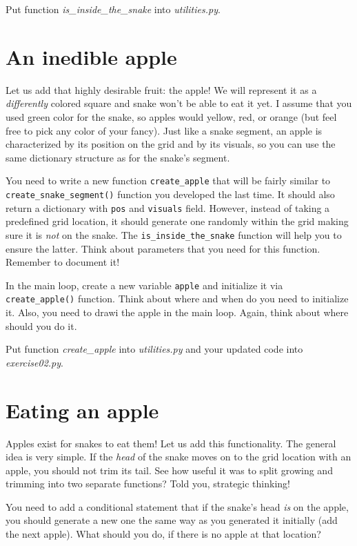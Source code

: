 \documentclass[
]{book}
\begin{document}
Put function \emph{is\_inside\_the\_snake} into \emph{utilities.py}.

\hypertarget{an-inedible-apple}{%
\section{An inedible apple}\label{an-inedible-apple}}

Let us add that highly desirable fruit: the apple! We will represent it as a \emph{differently} colored square and snake won't be able to eat it yet. I assume that you used green color for the snake, so apples would yellow, red, or orange (but feel free to pick any color of your fancy). Just like a snake segment, an apple is characterized by its position on the grid and by its visuals, so you can use the same dictionary structure as for the snake's segment.

You need to write a new function \texttt{create\_apple} that will be fairly similar to \texttt{create\_snake\_segment()} function you developed the last time. It should also return a dictionary with \texttt{pos} and \texttt{visuals} field. However, instead of taking a predefined grid location, it should generate one randomly within the grid making sure it is \emph{not} on the snake. The \texttt{is\_inside\_the\_snake} function will help you to ensure the latter. Think about parameters that you need for this function. Remember to document it!

In the main loop, create a new variable \texttt{apple} and initialize it via \texttt{create\_apple()} function. Think about where and when do you need to initialize it. Also, you need to drawi the apple in the main loop. Again, think about where should you do it.

Put function \emph{create\_apple} into \emph{utilities.py} and your updated code into \emph{exercise02.py}.

\hypertarget{eating-an-apple}{%
\section{Eating an apple}\label{eating-an-apple}}

Apples exist for snakes to eat them! Let us add this functionality. The general idea is very simple. If the \emph{head} of the snake moves on to the grid location with an apple, you should not trim its tail. See how useful it was to split growing and trimming into two separate functions? Told you, strategic thinking!

You need to add a conditional statement that if the snake's head \emph{is} on the apple, you should generate a new one the same way as you generated it initially (add the next apple). What should you do, if there is no apple at that location?
\end{document}

